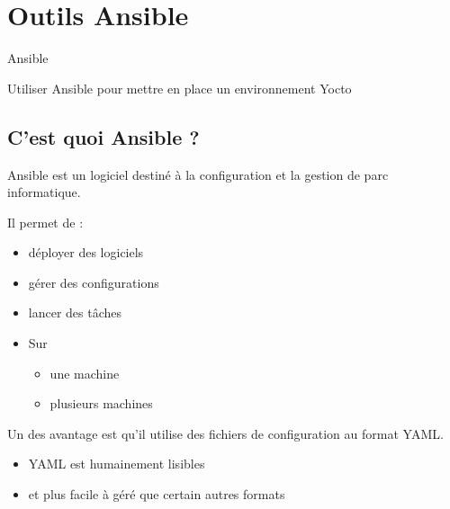 \documentclass[compress]{smilebeamer}
\begin{document}
\section{Outils Ansible}

\begin{frame}{Ansible}
\end{frame}

\begin{frame}
\begin{center}
\huge{Utiliser Ansible pour mettre en place un environnement Yocto}
\end{center}
\end{frame}

\subsection{C'est quoi Ansible ?}

\begin{frame}
\begin{definition}
Ansible est un logiciel destiné à la configuration et la gestion de parc informatique.
\end{definition}
Il permet de :
\begin{itemize}
	\item déployer des logiciels
	\item gérer des configurations
	\item lancer des tâches
\end{itemize}
\begin{itemize}
	\item[] Sur
	\begin{itemize}
	\item une machine
	\item plusieurs machines
	\end{itemize}
\end{itemize}
\end{frame}

\begin{frame}
	Un des avantage est qu'il utilise des fichiers de configuration au format YAML.
\begin{itemize}
	\item YAML est humainement lisibles
	\item et plus facile à géré que certain autres formats
\end{itemize}
\end{frame}
\end{document}
